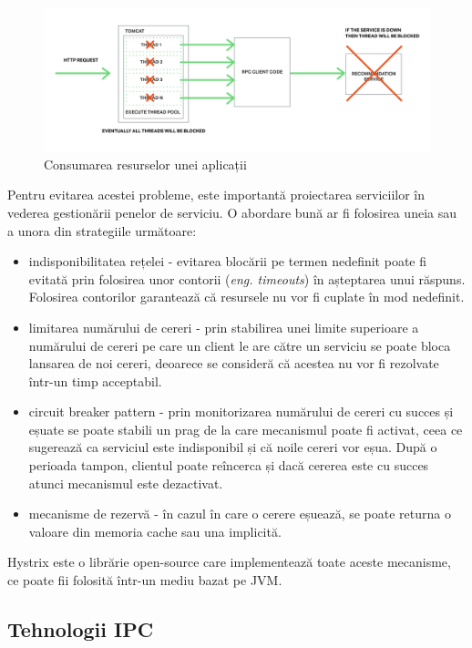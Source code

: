 \documentclass[12pt, a4paper, oneside, romanian]{teza-upb}
\begin{document}
\begin{figure}[ht]
\centering
\includegraphics[scale=0.15]{img/Richardson-microservices-part3-threads-blocked.png}
\caption{Consumarea resurselor unei aplicații}
\label{fig:arhi_componente}
\end{figure}

Pentru evitarea acestei probleme, este importantă proiectarea serviciilor în vederea gestionării penelor de serviciu. O abordare bună ar fi folosirea uneia sau a unora din strategiile următoare:

\begin{itemize}
 \item indisponibilitatea rețelei - evitarea blocării pe termen nedefinit poate fi evitată prin folosirea unor contorii (\textit{eng. timeouts}) în așteptarea unui răspuns. Folosirea contorilor garantează că resursele nu vor fi cuplate în mod nedefinit. 
 \item limitarea numărului de cereri - prin stabilirea unei limite superioare a numărului de cereri pe care un client le are către un serviciu se poate bloca lansarea de noi cereri, deoarece se consideră că acestea nu vor fi rezolvate într-un timp acceptabil. 
 \item circuit breaker pattern - prin monitorizarea numărului de cereri cu succes și eșuate se poate stabili un prag de la care mecanismul poate fi activat, ceea ce sugerează ca serviciul este indisponibil și că noile cereri vor eșua.  După o perioada tampon, clientul poate reîncerca și dacă cererea este cu succes atunci mecanismul este dezactivat. 
 \item mecanisme de rezervă - în cazul în care o cerere eșuează, se poate returna o valoare din memoria cache sau una implicită.
\end{itemize}

Hystrix este o librărie open-source care implementează toate aceste mecanisme, ce poate fii folosită într-un mediu bazat pe JVM. 

\subsection{Tehnologii IPC}
\end{document}
